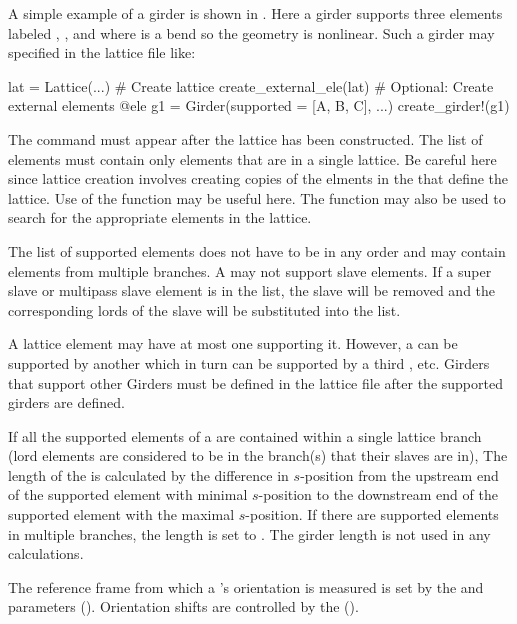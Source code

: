 A simple example of a girder is shown in . Here a girder supports three
elements labeled , , and  where  is a bend so the geometry is
nonlinear. Such a girder may specified in the lattice file like:
\begin{example}
  lat = Lattice(...)        # Create lattice
  create_external_ele(lat)  # Optional: Create external elements 
  @ele g1 = Girder(supported = [A, B, C], ...)
  create_girder!(g1)
\end{example}
The  command must appear after the lattice has been constructed.
The list of  elements must contain only elements that are in a single
lattice. Be careful here since lattice creation involves creating copies of the elments
in the  that define the lattice. Use of the function 
may be useful here. The  function may also be used to search for the appropriate
elements in the lattice. 

The list of supported elements does not have to be in any order and may contain elements from
multiple branches. A  may not support slave elements.
If a super slave or multipass slave element is in the list, the slave will
be removed and the corresponding lords of the slave will be substituted into the list.

A lattice element may have at most one  supporting it. However, a  can be
supported by another  which in turn can be supported by a third , etc. Girders
that support other Girders must be defined in the lattice file after the supported girders are
defined.

If all the supported elements of a  are contained within a single lattice branch
(lord elements are considered to be in the branch(s) that their slaves are in), The length 
of the  is calculated by the difference in $s$-position from the upstream end of the
supported element with minimal $s$-position to the downstream end of the supported element with
the maximal $s$-position. If there are supported elements in multiple branches, the length is
set to . The girder length is not used in any calculations.

The reference frame from which a 's orientation is measured is set by the
 and  parameters ().
Orientation shifts are controlled by the  ().

